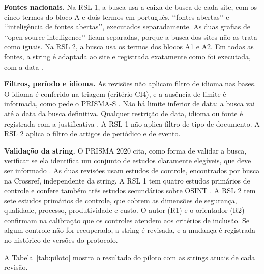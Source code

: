 \textbf{Fontes nacionais.} Na RSL 1, a busca usa a caixa de busca de cada
site, com os cinco termos do bloco A e dois termos em português,
\lq\lq fontes abertas\rq\rq{} e \lq\lq inteligência de fontes abertas\rq\rq,
executados separadamente. As duas grafias de \lq\lq open source
intelligence\rq\rq{} ficam separadas, porque a busca dos sites não as trata
como iguais. Na RSL 2, a busca usa os termos dos blocos A1 e A2. Em todas as
fontes, a string é adaptada ao site e registrada exatamente como foi
executada, com a data \cite[itens 8 e 13]{rethlefsen2021}.

\textbf{Filtros, período e idioma.} As revisões não aplicam filtro de idioma
nas bases. O idioma é conferido na triagem (critério CI4), e a ausência de
limite é informada, como pede o PRISMA-S \cite[item 9]{rethlefsen2021}. Não há
limite inferior de data: a busca vai até a data da busca definitiva. Qualquer
restrição de data, idioma ou fonte é registrada com a justificativa
\cite[seção 4.3.1]{kitchenham2023segress}. A RSL 1 não aplica filtro de tipo
de documento. A RSL 2 aplica o filtro de artigos de periódico e de evento.

\textbf{Validação da string.} O PRISMA 2020 cita, como forma de validar a
busca, verificar se ela identifica um conjunto de estudos claramente elegíveis,
que deve ser informado \cite[item 7]{page2021ee}. As duas revisões usam
estudos de controle, encontrados por busca na Crossref, independente da
string. A RSL 1 tem quatro estudos primários de controle e confere também três
estudos secundários sobre OSINT
\cite{ghioni2024,browne2024,pastorgalindo2020}. A RSL 2 tem sete estudos
primários de controle, que cobrem as dimensões de segurança, qualidade,
processo, produtividade e custo. O autor (R1) e o orientador (R2) confirmam
na calibração que os controles atendem aos critérios de inclusão. Se algum
controle não for recuperado, a string é revisada, e a mudança é registrada no
histórico de versões do protocolo.

A Tabela~\ref{tab:piloto} mostra o resultado do piloto com as strings atuais
de cada revisão.

